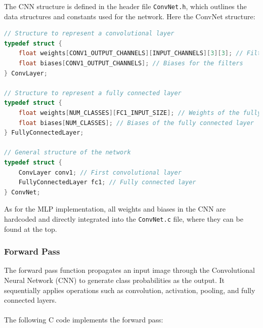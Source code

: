 \documentclass{article}
\begin{document}
The CNN structure is defined in the header file \texttt{ConvNet.h}, which outlines the data structures and constants used for the network. Here the ConvNet structure:

\begin{lstlisting}[language=C]
// Structure to represent a convolutional layer
typedef struct {
    float weights[CONV1_OUTPUT_CHANNELS][INPUT_CHANNELS][3][3]; // Filters of the convolutional layer 
    float biases[CONV1_OUTPUT_CHANNELS]; // Biases for the filters
} ConvLayer;

// Structure to represent a fully connected layer
typedef struct {
    float weights[NUM_CLASSES][FC1_INPUT_SIZE]; // Weights of the fully connected layer
    float biases[NUM_CLASSES]; // Biases of the fully connected layer
} FullyConnectedLayer;

// General structure of the network
typedef struct {
    ConvLayer conv1; // First convolutional layer
    FullyConnectedLayer fc1; // Fully connected layer
} ConvNet;
\end{lstlisting}

As for the MLP implementation, all weights and biases in the CNN are hardcoded and directly integrated into the \texttt{ConvNet.c} file, where they can be found at the top.

\subsubsection{Forward Pass}
The forward pass function propagates an input image through the Convolutional Neural Network (CNN) to generate class probabilities as the output. It sequentially applies operations such as convolution, activation, pooling, and fully connected layers.
\\\\The following C code implements the forward pass:
\end{document}
